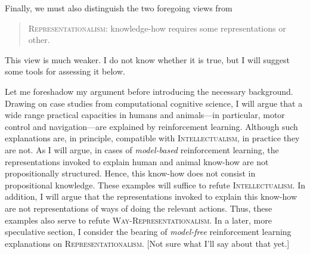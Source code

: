 Finally, we must also distinguish the two foregoing views from
\begin{quote}
	\textsc{Representationalism:} knowledge-how requires some representations or other.
\end{quote}
This view is much weaker.
I do not know whether it is true, but I will suggest some tools for assessing it below.

Let me foreshadow my argument before introducing the necessary background.
Drawing on case studies from computational cognitive science, I will argue that a wide range practical capacities in humans and animals---in particular, motor control and navigation---are explained by reinforcement learning.
Although such explanations are, in principle, compatible with \textsc{Intellectualism}, in practice they are not.
As I will argue, in cases of \emph{model-based} reinforcement learning, the representations invoked to explain human and animal know-how are not propositionally structured.
Hence, this know-how does not consist in propositional knowledge.
These examples will suffice to refute \textsc{Intellectualism}.
In addition, I will argue that the representations invoked to explain this know-how are not representations of ways of doing the relevant actions.
Thus, these examples also serve to refute \textsc{Way-Representationalism}.
In a later, more speculative section, I consider the bearing of \emph{model-free} reinforcement learning explanations on \textsc{Representationalism}.
[Not sure what I'll say about that yet.]

